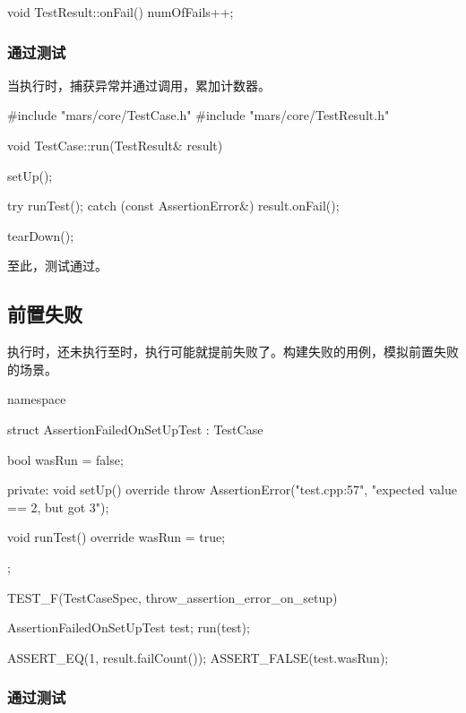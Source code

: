 \begin{content}
\begin{leftbar}
\begin{c++}[caption={\ttfamily{src/mars/core/TestResult.cc}}]
void TestResult::onFail() {
  numOfFails++;
}
 \end{c++}
\end{leftbar}

\subsubsection{通过测试}

当执行时，捕获异常并通过调用，累加计数器。

\begin{leftbar}
 \begin{c++}[caption={\ttfamily{src/mars/core/TestCase.cc}}]
#include "mars/core/TestCase.h"
#include "mars/core/TestResult.h"

void TestCase::run(TestResult& result) {
  setUp();

  try {
    runTest();
  } catch (const AssertionError&) {
    result.onFail();
  }

  tearDown();
}
 \end{c++}
\end{leftbar}

至此，测试通过。

\subsection{前置失败}

执行时，还未执行至时，执行可能就提前失败了。构建失败的用例，模拟前置失败的场景。

\begin{leftbar}
 \begin{c++}[caption={\ttfamily{test/mars/TestCaseSpec.cc}}]
namespace {
  struct AssertionFailedOnSetUpTest : TestCase {
    bool wasRun = false;

  private:
    void setUp() override {
      throw AssertionError("test.cpp:57", "expected value == 2, but got 3");
    }

    void runTest() override {
      wasRun = true;
    }
  };
}

TEST_F(TestCaseSpec, throw_assertion_error_on_setup) {
  AssertionFailedOnSetUpTest test;
  run(test);

  ASSERT_EQ(1, result.failCount());
  ASSERT_FALSE(test.wasRun);
}
 \end{c++}
\end{leftbar}

\subsubsection{通过测试}


\end{content}
